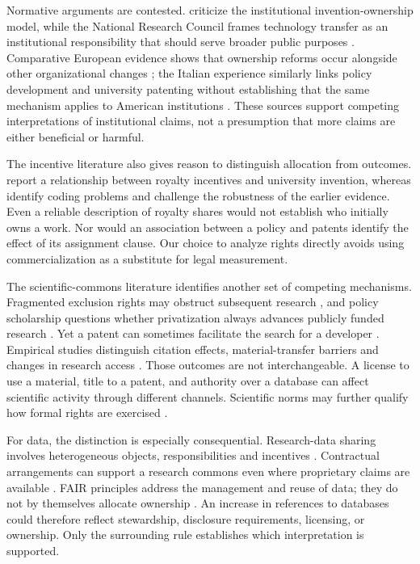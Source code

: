 \documentclass[12pt]{article}
\begin{document}
Normative arguments are contested. \citet{kenney2009} criticize the institutional invention-ownership model, while the National Research Council frames technology transfer as an institutional responsibility that should serve broader public purposes \citep{nrc2011}. Comparative European evidence shows that ownership reforms occur alongside other organizational changes \citep{geuna2011}; the Italian experience similarly links policy development and university patenting without establishing that the same mechanism applies to American institutions \citep{baldini2006}. These sources support competing interpretations of institutional claims, not a presumption that more claims are either beneficial or harmful.

The incentive literature also gives reason to distinguish allocation from outcomes. \citet{lach2008} report a relationship between royalty incentives and university invention, whereas \citet{ouellette2020} identify coding problems and challenge the robustness of the earlier evidence. Even a reliable description of royalty shares would not establish who initially owns a work. Nor would an association between a policy and patents identify the effect of its assignment clause. Our choice to analyze rights directly avoids using commercialization as a substitute for legal measurement.

The scientific-commons literature identifies another set of competing mechanisms. Fragmented exclusion rights may obstruct subsequent research \citep{heller1998}, and policy scholarship questions whether privatization always advances publicly funded research \citep{eisenberg1996,rai2003,nelson2004}. Yet a patent can sometimes facilitate the search for a developer \citep{hellmann2007}. Empirical studies distinguish citation effects, material-transfer barriers and changes in research access \citep{murray2007,walsh2005,murray2016}. Those outcomes are not interchangeable. A license to use a material, title to a patent, and authority over a database can affect scientific activity through different channels. Scientific norms may further qualify how formal rights are exercised \citep{rai1999}.

For data, the distinction is especially consequential. Research-data sharing involves heterogeneous objects, responsibilities and incentives \citep{borgman2012}. Contractual arrangements can support a research commons even where proprietary claims are available \citep{reichman2003}. FAIR principles address the management and reuse of data; they do not by themselves allocate ownership \citep{wilkinson2016}. An increase in references to databases could therefore reflect stewardship, disclosure requirements, licensing, or ownership. Only the surrounding rule establishes which interpretation is supported.
\end{document}
